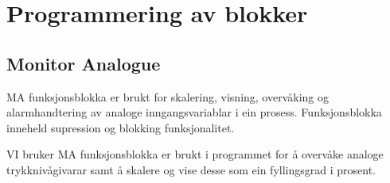 \section{Programmering av blokker}
\thispagestyle{fancy}


\subsection{Monitor Analogue}

\gls{MA} funksjonsblokka er brukt for skalering, visning, overvåking og alarmhandtering av analoge inngangsvariablar i ein prosess.
Funksjonsblokka inneheld supression og blokking funksjonalitet.

VI bruker \gls{MA} funksjonsblokka er brukt i programmet for å overvåke analoge trykknivågivarar samt å skalere og vise desse som ein fyllingsgrad i prosent.

